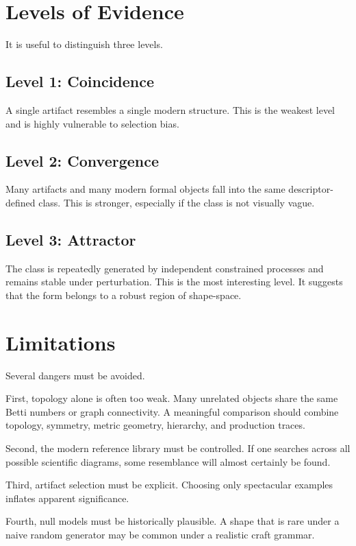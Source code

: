 \section{Levels of Evidence}

It is useful to distinguish three levels.

\subsection*{Level 1: Coincidence}
A single artifact resembles a single modern structure. This is the weakest level and is highly vulnerable to selection bias.

\subsection*{Level 2: Convergence}
Many artifacts and many modern formal objects fall into the same descriptor-defined class. This is stronger, especially if the class is not visually vague.

\subsection*{Level 3: Attractor}
The class is repeatedly generated by independent constrained processes and remains stable under perturbation. This is the most interesting level. It suggests that the form belongs to a robust region of shape-space.

\section{Limitations}

Several dangers must be avoided.

First, topology alone is often too weak. Many unrelated objects share the same Betti numbers or graph connectivity. A meaningful comparison should combine topology, symmetry, metric geometry, hierarchy, and production traces.

Second, the modern reference library must be controlled. If one searches across all possible scientific diagrams, some resemblance will almost certainly be found.

Third, artifact selection must be explicit. Choosing only spectacular examples inflates apparent significance.

Fourth, null models must be historically plausible. A shape that is rare under a naive random generator may be common under a realistic craft grammar.

